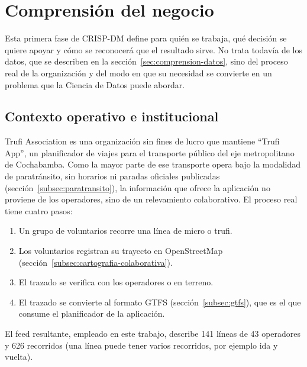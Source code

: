 \section{Comprensión del negocio}
\label{sec:comprension-negocio}

Esta primera fase de CRISP-DM define para quién se trabaja, qué decisión se quiere apoyar y
cómo se reconocerá que el resultado sirve. No trata todavía de los datos, que se describen
en la sección~\ref{sec:comprension-datos}, sino del proceso real de la organización y del
modo en que su necesidad se convierte en un problema que la Ciencia de Datos puede
abordar.

\subsection{Contexto operativo e institucional}
\label{sec:contexto-operativo}

Trufi Association es una organización sin fines de lucro que mantiene ``Trufi App'', un
planificador de viajes para el transporte público del eje metropolitano de Cochabamba.
Como la mayor parte de ese transporte opera bajo la modalidad de paratránsito, sin
horarios ni paradas oficiales publicadas (sección~\ref{subsec:paratransito}), la
información que ofrece la aplicación no proviene de los operadores, sino de un
relevamiento colaborativo. El proceso real tiene cuatro pasos:
\begin{enumerate}
  \item Un grupo de voluntarios recorre una línea de micro o trufi.
  \item Los voluntarios registran su trayecto en OpenStreetMap
        (sección~\ref{subsec:cartografia-colaborativa}).
  \item El trazado se verifica con los operadores o en terreno.
  \item El trazado se convierte al formato GTFS (sección~\ref{subsec:gtfs}), que es el que
        consume el planificador de la aplicación.
\end{enumerate}
El feed resultante, empleado en este trabajo, describe 141 líneas de 43 operadores y 626
recorridos (una línea puede tener varios recorridos, por ejemplo ida y vuelta).

